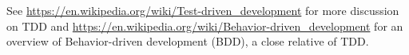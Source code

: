 
See \url{https://en.wikipedia.org/wiki/Test-driven_development} for more discussion on TDD and \url{https://en.wikipedia.org/wiki/Behavior-driven_development} for an overview of Behavior-driven development (BDD), a close relative of TDD.

